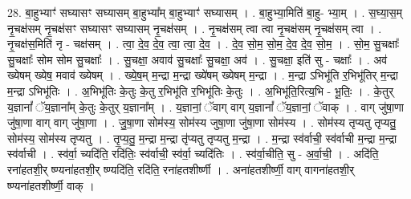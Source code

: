 \documentclass[17pt]{extarticle}
\begin{document}
28. बा॒हुभ्याꣳ॑ सघ्यासꣳ सघ्यासम् बा॒हुभ्या᳚म् बा॒हुभ्याꣳ॑ सघ्यासम् । . बा॒हुभ्या॒मिति॑ बा॒हु- भ्या॒म् । . स॒घ्या॒स॒म् नृ॒चक्ष॑सम् नृ॒चक्ष॑सꣳ सघ्यासꣳ सघ्यासम् नृ॒चक्ष॑सम् । . नृ॒चक्ष॑सम् त्वा त्वा नृ॒चक्ष॑सम् नृ॒चक्ष॑सम् त्वा । . नृ॒चक्ष॑स॒मिति॑ नृ - चक्ष॑सम् । . त्वा॒ दे॒व॒ दे॒व॒ त्वा॒ त्वा॒ दे॒व॒ । . दे॒व॒ सो॒म॒ सो॒म॒ दे॒व॒ दे॒व॒ सो॒म॒ । . सो॒म॒ सु॒चक्षाः᳚ सु॒चक्षाः᳚ सोम सोम सु॒चक्षाः᳚ । . सु॒चक्षा॒ अवाव॑ सु॒चक्षाः᳚ सु॒चक्षा॒ अव॑ । . सु॒चक्षा॒ इति॑ सु - चक्षाः᳚ । . अव॑ ख्येषम् ख्येष॒ मवाव॑ ख्येषम् । . ख्ये॒ष॒म् म॒न्द्रा म॒न्द्रा ख्ये॑षम् ख्येषम् म॒न्द्रा । . म॒न्द्रा ऽभिभू॑ति र॒भिभू॑तिर् म॒न्द्रा म॒न्द्रा ऽभिभू॑तिः । . अ॒भिभू॑तिः के॒तुः के॒तु र॒भिभू॑ति र॒भिभू॑तिः के॒तुः । . अ॒भिभू॑ति॒रित्य॒भि - भू॒तिः॒ । . के॒तुर् य॒ज्ञानां᳚ ॅय॒ज्ञाना᳚म् के॒तुः के॒तुर् य॒ज्ञाना᳚म् । . य॒ज्ञानां॒ ॅवाग् वाग् य॒ज्ञानां᳚ ॅय॒ज्ञानां॒ ॅवाक् । . वाग् जु॑षा॒णा जु॑षा॒णा वाग् वाग् जु॑षा॒णा । . जु॒षा॒णा सोम॑स्य॒ सोम॑स्य जुषा॒णा जु॑षा॒णा सोम॑स्य । . सोम॑स्य तृप्यतु तृप्यतु॒ सोम॑स्य॒ सोम॑स्य तृप्यतु । . तृ॒प्य॒तु॒ म॒न्द्रा म॒न्द्रा तृ॑प्यतु तृप्यतु म॒न्द्रा । . म॒न्द्रा स्व॑र्वाची॒ स्व॑र्वाची म॒न्द्रा म॒न्द्रा स्व॑र्वाची । . स्व॑र्वा॒ च्यदि॑ति॒ रदि॑तिः॒ स्व॑र्वाची॒ स्व॑र्वा॒ च्यदि॑तिः । . स्व॑र्वा॒चीति॒ सु - अ॒र्वा॒ची॒ । . अदि॑ति॒ रना॑हतशी॒र् ‌ष्ण्यना॑हतशी॒र्‌ ष्ण्यदि॑ति॒ रदि॑ति॒ रना॑हतशीर्ष्णी । . अना॑हतशीर्ष्णी॒ वाग् वागना॑हतशी॒र्‌ ष्ण्यना॑हतशीर्ष्णी॒ वाक् । \newline
\end{document}
